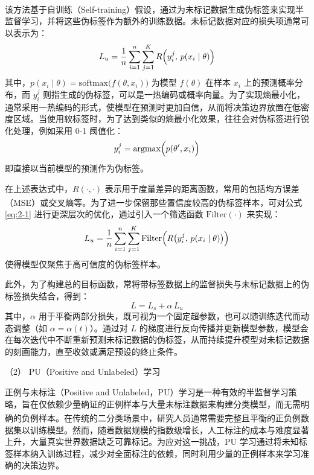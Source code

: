 该方法基于自训练（Self-training）假设\textsuperscript{\cite{lee2013pseudo}}，通过为未标记数据生成伪标签来实现半监督学习，并将这些伪标签作为额外的训练数据。未标记数据对应的损失项通常可以表示为：
\begin{equation}\label{eq:2-1}
	L_u = \frac{1}{n} \sum_{i=1}^{n} \sum_{j=1}^{K} R \Bigl( y_i^{j}, \, p(x_i \mid \theta) \Bigr)
\end{equation}
其中，$ p(x_i \mid \theta) = \mathrm{softmax}\bigl(f(\theta, x_i)\bigr) $ 为模型 $ f(\theta) $ 在样本 $ x_i $ 上的预测概率分布，而 $ y_i^{j} $ 则指生成的伪标签，可以是一热编码或概率向量。为了实现熵最小化，通常采用一热编码的形式，使模型在预测时更加自信，从而将决策边界放置在低密度区域。当使用软标签时，为了达到类似的熵最小化效果，往往会对伪标签进行锐化处理，例如采用 0-1 阈值化：
\begin{equation}\label{eq:2-2}
	y_i^{j} = \mathrm{argmax}\Bigl(p(\theta', x_i)\Bigr)
\end{equation}
即直接以当前模型的预测作为伪标签。

在上述表达式中，$ R(\cdot, \cdot) $ 表示用于度量差异的距离函数，常用的包括均方误差（MSE）或交叉熵等\textsuperscript{\cite{van2020survey}}。为了进一步保留那些置信度较高的伪标签样本，可对公式 \eqref{eq:2-1} 进行更深层次的优化，通过引入一个筛选函数 $\mathrm{Filter}(\cdot)$ 来实现：
\begin{equation}\label{eq:2-3}
	L_u = \frac{1}{n} \sum_{i=1}^{n} \sum_{j=1}^{K} 
	\mathrm{Filter} \Bigl( R \bigl( y_i^{j},\, p(x_i \mid \theta) \bigr) \Bigr)
\end{equation}
使得模型仅聚焦于高可信度的伪标签样本。

此外，为了构建总的目标函数，常将带标签数据上的监督损失与未标记数据上的伪标签损失结合，得到：
\begin{equation}\label{eq:2-4}
	L = L_s + \alpha \, L_u
\end{equation}
其中，$ \alpha $ 用于平衡两部分损失，既可视为一个固定超参数，也可以随训练迭代而动态调整（如 $\alpha = \alpha(t)$）。通过对 $ L $ 的梯度进行反向传播并更新模型参数，模型会在每次迭代中不断重新预测未标记数据的伪标签，从而持续提升模型对未标记数据的刻画能力，直至收敛或满足预设的终止条件。


（2） PU（Positive and Unlabeled）学习

正例与未标注（Positive and Unlabeled，PU）学习是一种有效的半监督学习策略，旨在仅依赖少量确证的正例样本与大量未标注数据来构建分类模型，而无需明确的负例样本\textsuperscript{\cite{elkan2008learning,mordelet2013bagging}}。在传统的二分类场景中，研究人员通常需要完整且平衡的正负例数据集以训练模型。然而，随着数据规模的指数级增长，人工标注的成本与难度显著上升，大量真实世界数据缺乏可靠标记。为应对这一挑战，PU 学习通过将未知标签样本纳入训练过程，减少对全面标注的依赖，同时利用少量的正例样本来学习准确的决策边界。

